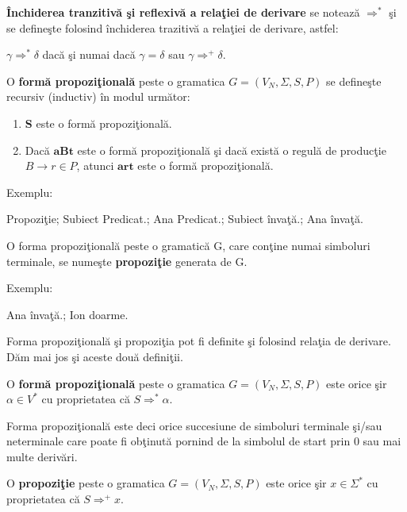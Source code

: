 \begin{definitie}
\textbf{Închiderea tranzitivă şi reflexivă a relaţiei de derivare} se notează $\Rightarrow^{*}$ şi se defineşte folosind închiderea trazitivă a relaţiei de derivare, astfel:

$\gamma \Rightarrow^{*} \delta$ dacă şi  numai dacă $\gamma = \delta$ sau $\gamma \Rightarrow^{+} \delta$.
\end{definitie}

\begin{definitie}
O \textbf{formă propoziţională} peste o gramatica $G = (V_{N}, \Sigma, S, P)$ se defineşte recursiv (inductiv) în modul următor:
\begin{enumerate}
\item
\textbf{S} este o formă propoziţională.
\item
Dacă $\textbf{aBt}$ este o formă propoziţională şi dacă există o regulă de producţie $B \rightarrow r \in P$, atunci $\textbf{art}$ este o formă propoziţională.
\end{enumerate}
\end{definitie}

Exemplu:

Propoziţie; Subiect Predicat.; Ana Predicat.; Subiect învaţă.; Ana învaţă.

\begin{definitie}
O forma propoziţională peste o gramatică G, care conţine numai simboluri terminale, se numeşte \textbf{propoziţie} generata de G.
\end{definitie}

Exemplu:

Ana învaţă.; Ion doarme.

Forma propoziţională şi propoziţia pot fi definite şi folosind relaţia de derivare. Dăm mai jos şi aceste două definiţii.

\begin{definitie}
O \textbf{formă propoziţională} peste o gramatica $G = (V_{N}, \Sigma, S, P)$ este orice şir $\alpha \in V^{*}$ cu proprietatea că $S \Rightarrow^{*} \alpha$.
\end{definitie}

Forma propoziţională este deci orice succesiune de simboluri terminale şi/sau neterminale care poate fi obţinută pornind de la simbolul de start prin 0 sau mai multe derivări.

\begin{definitie}
O \textbf{propoziţie} peste o gramatica $G = (V_{N}, \Sigma, S, P)$ este orice şir $x \in \Sigma^{*}$ cu proprietatea că $S \Rightarrow^{+} x$.
\end{definitie}

